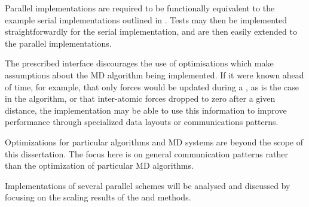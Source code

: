 Parallel implementations are required to be functionally equivalent
to the example serial implementations outlined in
.
%
Tests may then be implemented straightforwardly for the serial implementation,
and are then easily extended to the parallel implementations.

The prescribed interface discourages the use of optimisations which make
assumptions about the MD algorithm being implemented.
%
If it were known ahead of time, for example, that
only forces would be updated during a \pairoperation{},
as is the case in the \velocityverlet{} algorithm,
or that inter-atomic forces dropped to zero after a given distance,
the implementation may be able to use this information to improve
performance through specialized data layouts or communications patterns.

Optimizations for particular algorithms and MD systems are
beyond the scope of this dissertation.
%
The focus here is on general communication patterns rather than
the optimization of particular MD algorithms.

Implementations of several parallel schemes
will be analysed and discussed by focusing on
the scaling results of the \individualoperation{} and \pairoperation{} methods.
